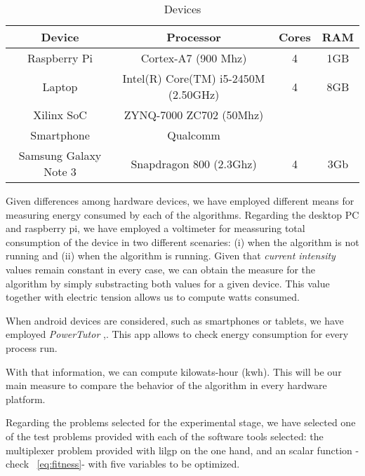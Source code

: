  
\begin{table}
\renewcommand{\arraystretch}{1.3}
\centering
\caption{Devices}
\label{Table:devices}
\begin{tabular}{cccc} \hline
Device&Processor&Cores&RAM\\ \hline
Raspberry Pi& Cortex-A7 (900 Mhz)& 4 &1GB \\
Laptop & Intel(R) Core(TM) i5-2450M (2.50GHz)&4&8GB\\
Xilinx SoC & ZYNQ-7000 ZC702 (50Mhz) & & \\
Smartphone & Qualcomm & & \\
Samsung Galaxy Note 3 & Snapdragon 800 (2.3Ghz) & 4 & 3Gb \\
\hline
\end{tabular}
\end{table}

Given differences among hardware devices, we have employed different means  %
for measuring energy consumed by each of the algorithms.  Regarding the desktop PC and raspberry pi, we have employed a voltimeter for meassuring total consumption of the device in two different scenaries:  (i) when the algorithm is not running and (ii) when the algorithm is running.  Given that \textit{current intensity} values remain constant in every case, we can obtain the measure for the algorithm by simply substracting both values for a given device.  This value together with electric tension allows us to compute watts consumed.

When android devices are considered, such as smartphones or tablets, we have employed  \textit{PowerTutor} \cite{powertutor},\cite{powertutor2}. This app allows to check energy consumption for every process run.

With that information, we can compute kilowats-hour (kwh).  This will be our main measure to compare the behavior of the algorithm in every hardware platform.


Regarding the problems selected for the experimental stage, we have selected one of the test problems provided with each of the software tools selected:  the multiplexer problem provided with lilgp on the one hand, and an scalar function -check ~\ref{eq:fitness}-  with five variables to be optimized. 

